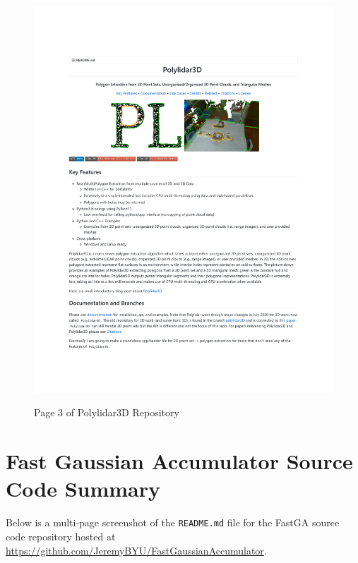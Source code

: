 \begin{figure}[h!]
    \centering\includegraphics[page=3, trim=1.0in 1.0in 1.0in 1.0in, width=.93\linewidth]{appendix_1/imgs/Polylidar3DReadme.pdf}
    \label{fig:apx1_pl3}
    \caption{Page 3 of Polylidar3D Repository} 
\end{figure}

\newpage

\section{Fast Gaussian Accumulator Source Code Summary} 
Below is a multi-page screenshot of the \texttt{README.md} file for the FastGA source code repository hosted at \url{https://github.com/JeremyBYU/FastGaussianAccumulator}.

